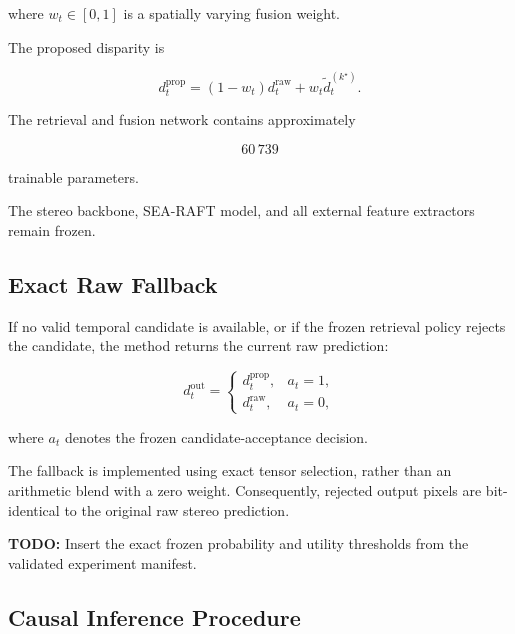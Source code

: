 \documentclass[11pt,a4paper]{article}
\begin{document}
where \(w_t\in[0,1]\) is a spatially varying fusion weight.

The proposed disparity is

\begin{equation}
d_t^{\mathrm{prop}}
=
\left(1-w_t\right)d_t^{\mathrm{raw}}
+
w_t\widetilde d_t^{(k^\star)}.
\label{eq:soft_fusion}
\end{equation}

The retrieval and fusion network contains approximately

\begin{equation}
60\,739
\end{equation}

trainable parameters.

The stereo backbone, SEA-RAFT model, and all external feature
extractors remain frozen.

\subsection{Exact Raw Fallback}
\label{sec:fallback}

If no valid temporal candidate is available, or if the frozen retrieval
policy rejects the candidate, the method returns the current raw
prediction:

\begin{equation}
d_t^{\mathrm{out}}
=
\begin{cases}
d_t^{\mathrm{prop}},
&
a_t=1,
\\[1mm]
d_t^{\mathrm{raw}},
&
a_t=0,
\end{cases}
\label{eq:final_output}
\end{equation}

where \(a_t\) denotes the frozen candidate-acceptance decision.

The fallback is implemented using exact tensor selection, rather than an
arithmetic blend with a zero weight.
Consequently, rejected output pixels are bit-identical to the original
raw stereo prediction.

\textbf{TODO:}
Insert the exact frozen probability and utility thresholds from the
validated experiment manifest.

\subsection{Causal Inference Procedure}
\end{document}
